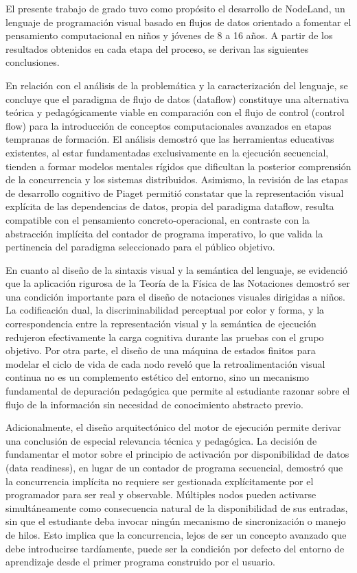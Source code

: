 
El presente trabajo de grado tuvo como propósito el desarrollo de NodeLand, un lenguaje de programación visual basado en flujos de datos orientado a fomentar el pensamiento computacional en niños y jóvenes de 8 a 16 años. A partir de los resultados obtenidos en cada etapa del proceso, se derivan las siguientes conclusiones.

En relación con el análisis de la problemática y la caracterización del lenguaje, se concluye que el paradigma de flujo de datos (dataflow) constituye una alternativa teórica y pedagógicamente viable en comparación con el flujo de control (control flow) para la introducción de conceptos computacionales avanzados en etapas tempranas de formación. El análisis demostró que las herramientas educativas existentes, al estar fundamentadas exclusivamente en la ejecución secuencial, tienden a formar modelos mentales rígidos que dificultan la posterior comprensión de la concurrencia y los sistemas distribuidos. Asimismo, la revisión de las etapas de desarrollo cognitivo de Piaget permitió constatar que la representación visual explícita de las dependencias de datos, propia del paradigma dataflow, resulta compatible con el pensamiento concreto-operacional, en contraste con la abstracción implícita del contador de programa imperativo, lo que valida la pertinencia del paradigma seleccionado para el público objetivo.

En cuanto al diseño de la sintaxis visual y la semántica del lenguaje, se evidenció que la aplicación rigurosa de la Teoría de la Física de las Notaciones demostró ser una condición importante para el diseño de notaciones visuales dirigidas a niños. La codificación dual, la discriminabilidad perceptual por color y forma, y la correspondencia entre la representación visual y la semántica de ejecución redujeron efectivamente la carga cognitiva durante las pruebas con el grupo objetivo. Por otra parte, el diseño de una máquina de estados finitos para modelar el ciclo de vida de cada nodo reveló que la retroalimentación visual continua no es un complemento estético del entorno, sino un mecanismo fundamental de depuración pedagógica que permite al estudiante razonar sobre el flujo de la información sin necesidad de conocimiento abstracto previo.

Adicionalmente, el diseño arquitectónico del motor de ejecución permite derivar una conclusión de especial relevancia técnica y pedagógica. La decisión de fundamentar el motor sobre el principio de activación por disponibilidad de datos (data readiness), en lugar de un contador de programa secuencial, demostró que la concurrencia implícita no requiere ser gestionada explícitamente por el programador para ser real y observable. Múltiples nodos pueden activarse simultáneamente como consecuencia natural de la disponibilidad de sus entradas, sin que el estudiante deba invocar ningún mecanismo de sincronización o manejo de hilos. Esto implica que la concurrencia, lejos de ser un concepto avanzado que debe introducirse tardíamente, puede ser la condición por defecto del entorno de aprendizaje desde el primer programa construido por el usuario.

